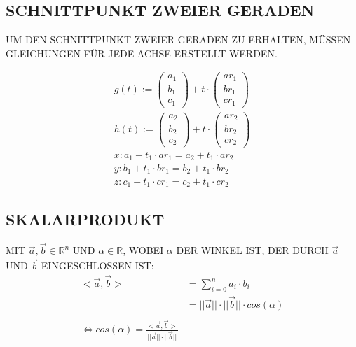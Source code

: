 \documentclass[a4paper,12pt]{report}
\begin{document}
\subsection{SCHNITTPUNKT ZWEIER GERADEN}
\thispagestyle{fancy} %
UM DEN SCHNITTPUNKT ZWEIER GERADEN ZU ERHALTEN, MÜSSEN GLEICHUNGEN FÜR
JEDE ACHSE ERSTELLT WERDEN.

\begin{equation}
  \label{eq:geraden}
  \begin{split}
    g(t) :=
    \begin{pmatrix}
      a_1 \\ b_1 \\ c_1
    \end{pmatrix}
    +
    t \cdot
    \begin{pmatrix}
      ar_1 \\ br_1 \\ cr_1
    \end{pmatrix}
    \\
    h(t) :=
    \begin{pmatrix}
      a_2 \\ b_2 \\ c_2
    \end{pmatrix}
    +
    t \cdot
    \begin{pmatrix}
      ar_2 \\ br_2 \\ cr_2
    \end{pmatrix}
    \\
    x: a_1 + t_1 \cdot ar_1 = a_2 + t_1 \cdot ar_2\\
    y: b_1 + t_1 \cdot br_1 = b_2 + t_1 \cdot br_2\\
    z: c_1 + t_1 \cdot cr_1 = c_2 + t_1 \cdot cr_2
  \end{split}
\end{equation}

\subsection{SKALARPRODUKT}
\thispagestyle{fancy} %
MIT $ \vec{a}, \vec{b} \in \mathbb{R}^n $ UND
$ \alpha \in \mathbb{R} $, WOBEI $ \alpha $ DER WINKEL IST, DER DURCH
$ \vec{a} $ UND $ \vec{b} $ EINGESCHLOSSEN IST:
\begin{equation}
  \label{eq:skalarprodukt}
  \begin{split}
    <\vec{a},\vec{b}> & = \sum_{i = 0}^n a_i \cdot b_i \\
    & = ||\vec{a}|| \cdot ||\vec{b}|| \cdot cos(\alpha) \\
    \\
    \Leftrightarrow cos(\alpha) = \frac{<\vec{a},\vec{b}>}{||\vec{a}|| \cdot ||\vec{b}||}
  \end{split}
\end{equation}
\end{document}
